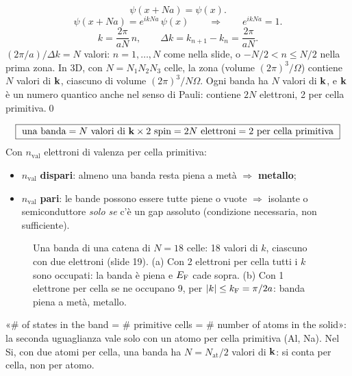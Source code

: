 \documentclass[11pt,a4paper]{article}
\begin{document}
\begin{dimostrazione}
\[
\psi(x+Na)=\psi(x).
\]
\[
\psi(x+Na)=e^{ikNa}\,\psi(x)\qquad\Longrightarrow\qquad e^{ikNa}=1 .
\]
\[
k=\frac{2\pi}{aN}\,n,\qquad\Delta k=k_{n+1}-k_n=\frac{2\pi}{aN}.
\]
$(2\pi/a)/\Delta k=N$ valori: $n=1,\dots,N$ come nella slide, o $-N/2<n\le N/2$ nella prima zona. In 3D, con $N=N_1N_2N_3$ celle, la zona
(volume $(2\pi)^3/\Omega$) contiene $N$ valori di $\mathbf k$, ciascuno di volume $(2\pi)^3/N\Omega$.
Ogni banda ha $N$ valori di $\mathbf k$, e $\mathbf k$ è un numero quantico anche nel senso di Pauli: contiene $2N$ elettroni, 2 per cella primitiva.\qed
\end{dimostrazione}

\begin{chiave}
\[
\boxed{\ \text{una banda}=N\ \text{valori di }\vk\times2\ \text{spin}=2N\ \text{elettroni}=2\ \text{per cella primitiva}\ }
\]
Con $n_{\mathrm{val}}$ elettroni di valenza per cella primitiva:
\begin{itemize}[leftmargin=*, itemsep=1pt, topsep=1pt]
\item $n_{\mathrm{val}}$ \textbf{dispari}: almeno una banda resta piena a metà $\Rightarrow$ \textbf{metallo};
\item $n_{\mathrm{val}}$ \textbf{pari}: le bande possono essere tutte piene o vuote $\Rightarrow$ isolante o semiconduttore \emph{solo se} c'è un gap
assoluto (condizione necessaria, non sufficiente).
\end{itemize}
\end{chiave}

\begin{figure}[tbp]
\centering
{}
\caption{Una banda di una catena di $N=18$ celle: 18 valori di $k$, ciascuno con due elettroni (slide 19). (a) Con 2 elettroni per cella tutti i
$k$ sono occupati: la banda è piena e $E_{\mathrm F}$ cade sopra. (b) Con 1 elettrone per cella se ne occupano 9, per $|k|\le k_{\mathrm F}=\pi/2a$: banda piena a metà,
metallo.}\label{fig:riemp}
\end{figure}

\begin{osservazione}
«\# of states in the band = \# primitive cells = \# number of atoms in the solid»: la seconda uguaglianza vale solo con un atomo per cella primitiva
(Al, Na). Nel Si, con due atomi per cella, una banda ha $N=N_{\mathrm{at}}/2$ valori di $\mathbf k$: si conta per cella, non per atomo.
\end{osservazione}
\end{document}
